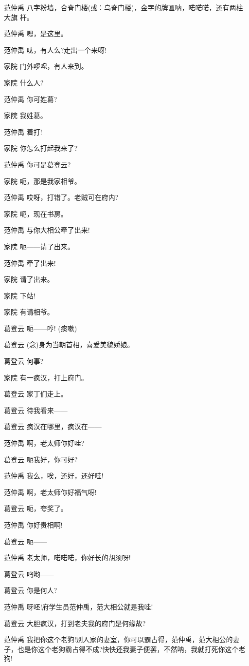 范仲禹
八字粉墙，合脊门楼(或：乌脊门楼)，金字的牌匾呐，喏喏喏，还有两柱大旗
杆。

范仲禹 嗯，是这里。

范仲禹 呔，有人么?走出一个来呀!

家院 门外啰唣，有人来到。

家院 什么人?

范仲禹 你可姓葛?

家院 我姓葛。

范仲禹 着打!

家院 你怎么打起我来了?

范仲禹 你可是葛登云?

家院 呃，那是我家相爷。

范仲禹 哎呀，打错了。老贼可在府内?

家院 呃，现在书房。

范仲禹 与你大相公牵了出来!

家院 呃------请了出来。

范仲禹 牵了出来!

家院 请了出来。

家院 下站!

家院 有请相爷。

葛登云 呃------哼! (痰嗽)

葛登云 (念)身为当朝首相，喜爱美貌娇娘。

葛登云 何事?

家院 有一疯汉，打上府门。

葛登云 家丁们走上。

葛登云 待我看来------

葛登云 疯汉在哪里，疯汉在------

范仲禹 啊，老太师你好哇?

葛登云 呃我好，你可好?

范仲禹 我么，唉，还好，还好哇!

范仲禹 啊，老太师你好福气呀!

葛登云 呃，夸奖了。

范仲禹 你好贵相啊!

葛登云 呃------

范仲禹 老太师，喏喏喏，你好长的胡须呀!

葛登云 呜哟------

葛登云 你是何人?

范仲禹 呀呸!府学生员范仲禹，范大相公就是我哇!

葛登云 大胆疯汉，打到老夫我的府门是何缘故?

范仲禹
我把你这个老狗!别人家的妻室，你可以霸占得，范仲禹，范大相公的妻子，也是你这个老狗霸占得不成?快快还我妻子便罢，不然呐，我就打死你这个老狗!

